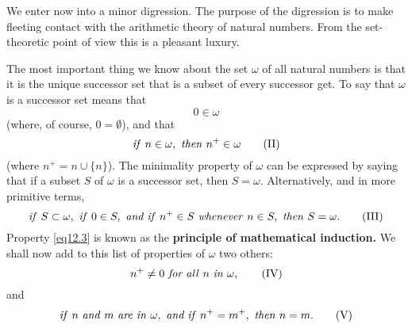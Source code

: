 We enter now into a minor digression. The purpose of the digression is to make fleeting contact with the arithmetic theory of natural numbers. From the set-theoretic point of view this is a pleasant luxury. 

The most important thing we know about the set $\omega$ of all natural numbers is that it is the unique successor set that is a subset of every successor get. To say that $\omega$ is a successor set means that
\begin{equation}
\label{eq12.1}
0 \in \omega \tag{I}
\end{equation}
(where, of course, $0 = \emptyset$), and that 
\begin{equation}
\label{eq12.2}
\text{\textit{if} } n \in\omega, \text{ \textit{then} } n^{+} \in \omega \tag{II}
\end{equation}
(where $n^{+} = n \cup \{ n \}$). The minimality property of $\omega$ can be expressed by saying that if a subset $S$ of $\omega$ is a successor set, then $S = \omega$. Alternatively, and in more primitive terms,
\begin{equation}
\label{eq12.3}
\text{\textit{if} } S \subset \omega, \text{ \textit{if} } 0 \in S, \text{ \textit{and if} } n^{+} \in S \text{ \textit{whenever} } n \in S, \text{ \textit{then} } S = \omega . \tag{III}
\end{equation}
Property \eqref{eq12.3} is known as the \textbf{principle of mathematical induction.} We shall now add to this list of properties of $\omega$ two others: 
\begin{equation}
\label{eq12.4}
n^{+} \neq 0 \text{ \textit{for all} } n \text{ \textit{in} } \omega , \tag{IV}
\end{equation}
and
\begin{equation}
\label{eq12.5}
\text{\textit{if} } n \text{ \textit{and} } m \text{ \textit{are in} } \omega , \text{ \textit{and if} } n^{+} = m^{+} , \text{ \textit{then} } n = m.\tag{V}
\end{equation}

